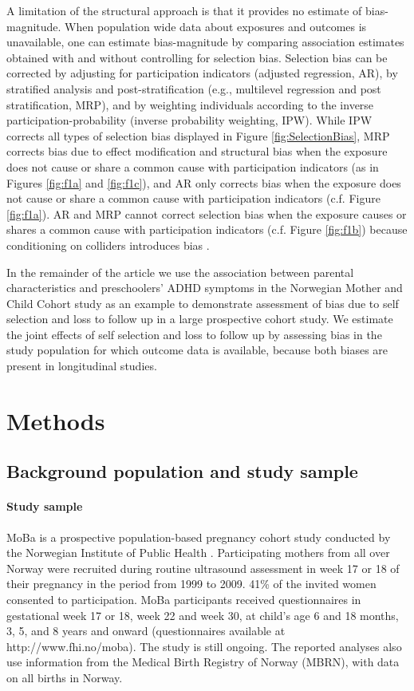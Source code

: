\documentclass[]{article}
\begin{document}
A limitation of the structural approach is that it provides no estimate of bias-magnitude. When population wide data about exposures and outcomes is unavailable, one can estimate bias-magnitude by comparing association estimates obtained with and without controlling for selection bias. Selection bias can be corrected by adjusting for participation indicators (adjusted regression, AR), by stratified analysis and post-stratification  (e.g., multilevel regression and post stratification, MRP\supercite{Gelman2007-hx}), and by weighting individuals according to the inverse participation-probability (inverse probability weighting, IPW\supercite{Seaman2013-rj}). While IPW corrects all types of selection bias displayed in Figure \ref{fig:SelectionBias}, MRP corrects bias due to effect modification and structural bias when the exposure does not cause or share a common cause with participation indicators (as in Figures \ref{fig:f1a} and \ref{fig:f1c}), and AR only corrects bias when the exposure does not cause or share a common cause with participation indicators (c.f. Figure \ref{fig:f1a}). AR and MRP cannot correct selection bias when the exposure causes or shares a common cause with participation indicators (c.f. Figure \ref{fig:f1b}) because conditioning on colliders introduces bias \supercite{Cole2010-za}.

In the remainder of the article we use the association between parental characteristics and preschoolers' ADHD symptoms in the Norwegian Mother and Child Cohort study as an example to demonstrate assessment of bias due to self selection and loss to follow up in a large prospective cohort study. We estimate the joint effects of self selection and loss to follow up by assessing bias in the study population for which outcome data is available, because both biases are present in longitudinal studies.

\section{Methods}

\subsection{Background population and study sample}

\paragraph{Study sample} MoBa is a prospective population-based pregnancy cohort study conducted by the Norwegian Institute of Public Health \supercite{Magnus2006-jj,Magnus2016-ht}. Participating mothers from all over Norway were recruited during routine ultrasound assessment in week 17 or 18 of their pregnancy in the period from 1999 to 2009. 41\% of the invited women consented to participation. MoBa participants received questionnaires in gestational week 17 or 18, week 22 and week 30, at child's age 6 and 18 months, 3, 5, and 8 years and onward (questionnaires available at http://www.fhi.no/moba). The study is still ongoing. The reported analyses also use information from the Medical Birth Registry of Norway (MBRN)\supercite{Irgens2000-ra}, with data on all births in Norway.
\end{document}
